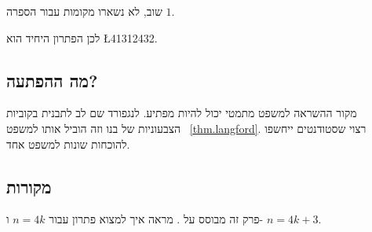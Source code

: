\noindent
שוב, לא נשארו מקומות עבור הספרה $1$.

\medskip

\noindent 
לכן הפתרון היחיד הוא
\L{41312432}.

\subsection*{מה ההפתעה?}

מקור ההשראה למשפט מתמטי יכול להיות מפתיע. לנגפורד
שם לב לתבנית בקוביות הצבעוניות של בנו וזה הוביל אותו למשפט%
~\ref{thm.langford}.
רצוי שסטודנטים ייחשפו להוכחות שונות למשפט אחד.

\subsection*{מקורות}
פרק זה מבוסס על
\cite{miller}.
\cite{davies}
מראה איך למצוא פתרון עבור
$n=4k$
ו-%
$n=4k+3$.
